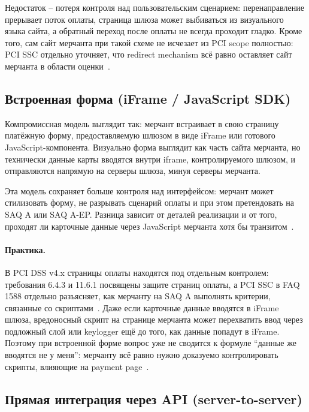 Недостаток -- потеря контроля над пользовательским сценарием:
перенаправление прерывает поток оплаты, страница шлюза может
выбиваться из визуального языка сайта, а обратный переход
после оплаты не всегда проходит гладко. Кроме того, сам сайт
мерчанта при такой схеме не исчезает из PCI scope полностью:
PCI SSC отдельно уточняет, что redirect mechanism всё равно
оставляет сайт мерчанта в области оценки~\cite{pci-faq-1332}.

\subsection*{Встроенная форма (iFrame / JavaScript SDK)}

Компромиссная модель выглядит так: мерчант встраивает
в свою страницу платёжную форму, предоставляемую шлюзом
в виде iFrame или готового JavaScript-компонента.
Визуально форма
выглядит как часть сайта мерчанта, но технически данные карты
вводятся внутри iframe, контролируемого шлюзом, и отправляются
напрямую на серверы шлюза, минуя серверы мерчанта.

Эта модель сохраняет больше контроля над интерфейсом: мерчант
может стилизовать форму, не разрывать сценарий оплаты и при
этом претендовать на SAQ A или SAQ A-EP. Разница зависит
от деталей реализации и от того, проходят ли карточные данные
через JavaScript мерчанта хотя бы транзитом~\cite{pci-faq-1291,pci-faq-1293}.

\paragraph{Практика.}
  В PCI DSS v4.x страницы оплаты находятся под отдельным
  контролем: требования 6.4.3 и 11.6.1 посвящены защите
  страниц оплаты, а PCI SSC в FAQ 1588 отдельно разъясняет,
  как мерчанту на SAQ A выполнять критерии, связанные
  со скриптами~\cite{pci-dss-4,pci-faq-1588}.
  Даже если карточные данные вводятся в iFrame шлюза, вредоносный
  скрипт на странице мерчанта может перехватить ввод через
  подложный слой или keylogger ещё до того, как данные попадут
  в iFrame. Поэтому при встроенной форме вопрос уже не сводится
  к формуле \enquote{данные же вводятся не у меня}: мерчанту
  всё равно нужно доказуемо контролировать скрипты, влияющие
  на payment page~\cite{pci-faq-1588}.


\subsection*{Прямая интеграция через API (server-to-server)}

